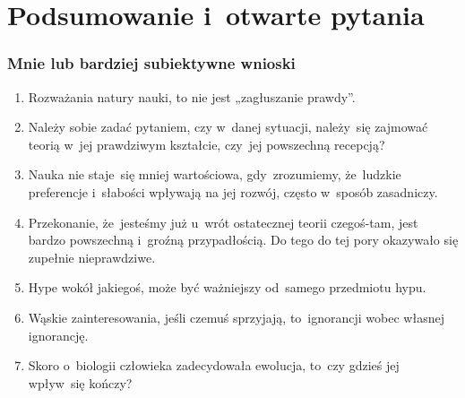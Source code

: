 \documentclass[10pt,t]{beamer}
\begin{document}
\section{Podsumowanie i~otwarte pytania}



\begin{frame}
  \frametitle{Mnie lub bardziej subiektywne wnioski}


  \begin{enumerate}
    \RaggedRight

  \item Rozważania natury nauki, to nie jest „zagłuszanie prawdy”.

  \item Należy sobie zadać pytaniem, czy w~danej sytuacji,
    należy~się zajmować teorią w~jej prawdziwym kształcie, czy~jej
    powszechną recepcją?

  \item Nauka nie staje~się mniej wartościowa, gdy~zrozumiemy,
    że~ludzkie preferencje i~słabości wpływają na jej rozwój, często
    w~sposób zasadniczy.

  \item Przekonanie, że~jesteśmy już u~wrót ostatecznej teorii
    czegoś-tam, jest bardzo powszechną i~groźną przypadłością. Do tego do
    tej pory okazywało się zupełnie nieprawdziwe.

  \item Hype wokół jakiegoś, może być ważniejszy od~samego przedmiotu
    hypu.

  \item Wąskie zainteresowania, jeśli czemuś sprzyjają,
    to~ignorancji wobec własnej ignorancję.

  \item Skoro o~biologii człowieka zadecydowała ewolucja, to~czy
    gdzieś jej wpływ~się kończy?

    \end{enumerate}

\end{frame}
\end{document}
